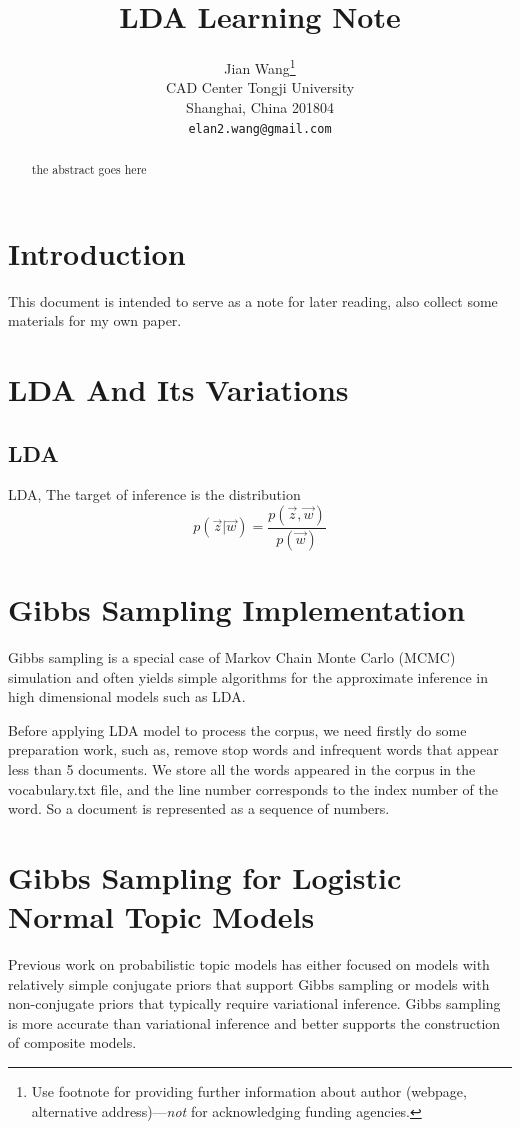 \documentclass{article} %
\title{LDA Learning Note}
\author{
Jian Wang\thanks{ Use footnote for providing further information about author (webpage, alternative address)---\emph{not} for acknowledging funding agencies.} \\
CAD Center Tongji University\\
Shanghai, China 201804 \\
\texttt{elan2.wang@gmail.com} 
}
\begin{document}
\maketitle

\begin{abstract}
the abstract goes here
\end{abstract}

\section{Introduction}
This document is intended to serve as a note for later reading, also collect some materials for my own paper.
\section{LDA And Its Variations}

\subsection{LDA}
LDA\cite{Blei:2003}, The target of inference is the distribution
\begin{equation}
p\left ( \vec{z}|\vec{w} \right ) = \frac{p\left ( \vec{z}, \vec{w} \right )}{p\left ( \vec{w} \right )}
\end{equation}

\section{Gibbs Sampling Implementation}
Gibbs sampling is a special case of Markov Chain Monte Carlo (MCMC) simulation and often yields simple algorithms for the approximate inference in high dimensional models such as LDA.

Before applying LDA model to process the corpus, we need firstly do some preparation work, such as, remove stop words and infrequent words that appear less than 5 documents. We store all the words appeared in the corpus in the vocabulary.txt file, and the line number corresponds to the index number of the word. So a document is represented as a sequence of numbers.

\section{Gibbs Sampling for Logistic Normal Topic Models}
Previous work on probabilistic topic models has either focused on models with relatively simple conjugate priors that support Gibbs sampling or models with non-conjugate priors that typically require variational inference. Gibbs sampling is more accurate than variational inference and better supports the construction of composite models\cite{mimno2008gibbs}.
\end{document}
